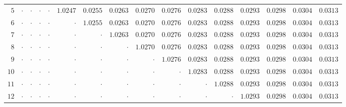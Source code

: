 \begin{table}[H]
{\begin{tabular}{r|rrrrrrrrrrrrrrr}
$5$ & $\cdot$ & $\cdot$ & $\cdot$ & $\cdot$ & \cellcolor{orange!35}$\mathbf{1.0247}$ & \cellcolor{cyan!18}$0.0255$ & \cellcolor{cyan!18}$0.0263$ & \cellcolor{cyan!18}$0.0270$ & \cellcolor{cyan!18}$0.0276$ & \cellcolor{cyan!18}$0.0283$ & \cellcolor{cyan!18}$0.0288$ & \cellcolor{cyan!18}$0.0293$ & \cellcolor{cyan!18}$0.0298$ & \cellcolor{cyan!18}$0.0304$ & \cellcolor{cyan!18}$0.0313$ \\
$6$ & $\cdot$ & $\cdot$ & $\cdot$ & $\cdot$ & $\cdot$ & \cellcolor{orange!35}$\mathbf{1.0255}$ & \cellcolor{cyan!18}$0.0263$ & \cellcolor{cyan!18}$0.0270$ & \cellcolor{cyan!18}$0.0276$ & \cellcolor{cyan!18}$0.0283$ & \cellcolor{cyan!18}$0.0288$ & \cellcolor{cyan!18}$0.0293$ & \cellcolor{cyan!18}$0.0298$ & \cellcolor{cyan!18}$0.0304$ & \cellcolor{cyan!18}$0.0313$ \\
$7$ & $\cdot$ & $\cdot$ & $\cdot$ & $\cdot$ & $\cdot$ & $\cdot$ & \cellcolor{orange!35}$\mathbf{1.0263}$ & \cellcolor{cyan!18}$0.0270$ & \cellcolor{cyan!18}$0.0276$ & \cellcolor{cyan!18}$0.0283$ & \cellcolor{cyan!18}$0.0288$ & \cellcolor{cyan!18}$0.0293$ & \cellcolor{cyan!18}$0.0298$ & \cellcolor{cyan!18}$0.0304$ & \cellcolor{cyan!18}$0.0313$ \\
$8$ & $\cdot$ & $\cdot$ & $\cdot$ & $\cdot$ & $\cdot$ & $\cdot$ & $\cdot$ & \cellcolor{orange!35}$\mathbf{1.0270}$ & \cellcolor{cyan!18}$0.0276$ & \cellcolor{cyan!18}$0.0283$ & \cellcolor{cyan!18}$0.0288$ & \cellcolor{cyan!18}$0.0293$ & \cellcolor{cyan!18}$0.0298$ & \cellcolor{cyan!18}$0.0304$ & \cellcolor{cyan!18}$0.0313$ \\
$9$ & $\cdot$ & $\cdot$ & $\cdot$ & $\cdot$ & $\cdot$ & $\cdot$ & $\cdot$ & $\cdot$ & \cellcolor{orange!35}$\mathbf{1.0276}$ & \cellcolor{cyan!18}$0.0283$ & \cellcolor{cyan!18}$0.0288$ & \cellcolor{cyan!18}$0.0293$ & \cellcolor{cyan!18}$0.0298$ & \cellcolor{cyan!18}$0.0304$ & \cellcolor{cyan!18}$0.0313$ \\
$10$ & $\cdot$ & $\cdot$ & $\cdot$ & $\cdot$ & $\cdot$ & $\cdot$ & $\cdot$ & $\cdot$ & $\cdot$ & \cellcolor{orange!35}$\mathbf{1.0283}$ & \cellcolor{cyan!18}$0.0288$ & \cellcolor{cyan!18}$0.0293$ & \cellcolor{cyan!18}$0.0298$ & \cellcolor{cyan!18}$0.0304$ & \cellcolor{cyan!18}$0.0313$ \\
$11$ & $\cdot$ & $\cdot$ & $\cdot$ & $\cdot$ & $\cdot$ & $\cdot$ & $\cdot$ & $\cdot$ & $\cdot$ & $\cdot$ & \cellcolor{orange!35}$\mathbf{1.0288}$ & \cellcolor{cyan!18}$0.0293$ & \cellcolor{cyan!18}$0.0298$ & \cellcolor{cyan!18}$0.0304$ & \cellcolor{cyan!18}$0.0313$ \\
$12$ & $\cdot$ & $\cdot$ & $\cdot$ & $\cdot$ & $\cdot$ & $\cdot$ & $\cdot$ & $\cdot$ & $\cdot$ & $\cdot$ & $\cdot$ & \cellcolor{orange!35}$\mathbf{1.0293}$ & \cellcolor{cyan!18}$0.0298$ & \cellcolor{cyan!18}$0.0304$ & \cellcolor{cyan!18}$0.0313$ \\

\end{tabular}}
\end{table}
